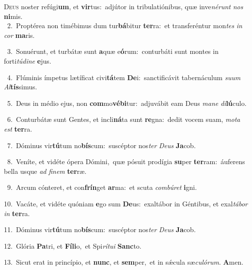 \lettrine{\initial\textcolor{\initialcolor}{D}}{eus} noster refúgi\-\textbf{um}\-, et \textbf{vir}\-tus:~\star adjútor in tribulatiónibus, quæ inve\-\textit{né}\-\textit{runt} \textit{nos} \textbf{ni}\-mis.\\
{\numbfont\textcolor{\numbcolor}{~2.}}~Proptérea non timébimus dum tur\-\textbf{bá}\-bitur \textbf{ter}\-ra:~\star et transferéntur mon\textit{tes} \textit{in} \textit{cor} \textbf{ma}\-ris.\par
{\numbfont\textcolor{\numbcolor}{~3.}}~Sonuérunt, et turbátæ sunt \textbf{a}\-quæ e\-\textbf{ó}\-rum:~\star conturbáti sunt montes in forti\-\textit{tú}\-\textit{di}\textit{ne} \textbf{e}\-jus.\par
{\numbfont\textcolor{\numbcolor}{~4.}}~Flúminis ímpetus lætíficat civi\-\textbf{tá}\-tem \textbf{De}\-i:~\star sanctificávit tabernáculum \textit{su}\-\textit{um} \textit{Al}\-\textbf{tís}simus.\par
{\numbfont\textcolor{\numbcolor}{~5.}}~Deus in médio ejus, non \textbf{com}\-mo\-\textbf{vé}\-\textbf{bi}tur:~\star adjuvábit eam Deus \textit{ma}\-\textit{ne} \textit{di}\-\textbf{lú}culo.\par
{\numbfont\textcolor{\numbcolor}{~6.}}~Conturbátæ sunt Gentes, et incli\-\textbf{ná}\-ta sunt \textbf{re}\-gna:~\star dedit vocem suam, \textit{mo}\-\textit{ta} \textit{est} \textbf{ter}\-ra.\par
{\numbfont\textcolor{\numbcolor}{~7.}}~Dóminus vir\-\textbf{tú}\-tum no\-\textbf{bís}\-cum:~\star suscéptor nos\textit{ter} \textit{De}\-\textit{us} \textbf{Ja}\-cob.\par
{\numbfont\textcolor{\numbcolor}{~8.}}~Veníte, et vidéte ópera Dómini,~\dagger quæ pósuit prodígia \textbf{su}\-per \textbf{ter}\-ram:~\star áuferens bella usque \textit{ad} \textit{fi}\-\textit{nem} \textbf{ter}\-ræ.\par
{\numbfont\textcolor{\numbcolor}{~9.}}~Arcum cónteret, et con\-\textbf{frín}\-get \textbf{ar}\-ma:~\star et scuta \textit{com}\-\textit{bú}\textit{ret} \textbf{i}\-gni.\par
{\numbfont\textcolor{\numbcolor}{10.}}~Vacáte, et vidéte quóniam \textbf{e}\-go sum \textbf{De}\-us:~\star exaltábor in Géntibus, et exal\-\textit{tá}\-\textit{bor} \textit{in} \textbf{ter}\-ra.\par
{\numbfont\textcolor{\numbcolor}{11.}}~Dóminus vir\-\textbf{tú}\-tum no\-\textbf{bís}\-cum:~\star suscéptor nos\textit{ter} \textit{De}\-\textit{us} \textbf{Ja}\-cob.\par
{\numbfont\textcolor{\numbcolor}{12.}}~Glória \textbf{Pa}\-tri, et \textbf{Fí}\-\textbf{li}o,~\star et Spi\-\textit{rí}\-\textit{tu}\textit{i} \textbf{Sanc}\-to.\par
{\numbfont\textcolor{\numbcolor}{13.}}~Sicut erat in princípio, et \textbf{nunc}\-, et \textbf{sem}\-per,~\star et in sǽcula sæ\-\textit{cu}\-\textit{ló}\textit{rum}. \textbf{A}\-men.\par
